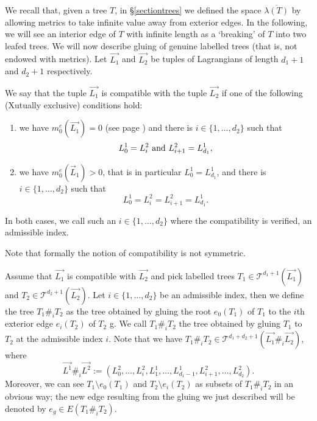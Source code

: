 We recall that, given a tree $T$, in \S \ref{sectiontrees} we defined the space $\overline{\lambda(T)}$ by allowing metrics to take infinite value away from exterior edges. In the following, we will see an interior edge of $T$ with infinite length as a `breaking' of $T$ into two leafed trees. We will now describe gluing of genuine labelled trees (that is, not endowed with metrics). Let $\vec{L_1}$ and $\vec{L_2}$ be tuples of Lagrangians of length $d_1+1$ and $d_2+1$ respectively.
\begin{dfn} \label{compatibilitydef}
	We say that the tuple $\vec{L_1}$ is compatible with the tuple $\vec{L_2}$ if one of the following (Xutually exclusive) conditions hold:
	\begin{enumerate}
		\item\label{firstcomp} we have $m_0^e(\vec{L_1})=0$ (see page \pageref{defofmis}) and there is $i\in \{1,\ldots, d_2\}$ such that $$L_0^1=L_i^2 \textnormal{   and   }L_{i+1}^2=L_{d_1}^1,$$
		\item\label{secondcomp} we have $m_0^e(\vec{L}_1)>0$, that is in particular $L_0^1=L_{d_1}^1$, and there is $i\in\{1,\ldots,d_2\}$ such that $$L_0^1=L_i^2=L_{i+1}^2=L_{d_1}^1.$$ 
	\end{enumerate}
	In both cases, we call such an $i\in \{1,\ldots, d_2\}$ where the compatibility is verified, an admissible index.
\end{dfn}
\begin{rem}
	Note that formally the notion of compatibility is not symmetric.
\end{rem}
\noindent Assume that $\vec{L_1}$ is compatible with $\vec{L_2}$ and pick labelled trees $T_1\in \mathcal{T}^{d_1+1}(\vec{L_1})$ and $T_2\in \mathcal{T}^{d_2+1}(\vec{L_2})$. Let $i\in \{1,\ldots, d_2\}$ be an admissible index, then we define the tree $T_1\#_iT_2$ as the tree obtained by gluing the root $e_0(T_1)$ of $T_1$ to the $i$th exterior edge $e_i(T_2)$ of $T_2$ g. We call $T_1\#_iT_2$ the tree obtained by gluing $T_1$ to $T_2$ at the admissible index $i$. Note that we have $T_1\#_iT_2\in \mathcal{T}^{d_1+d_2+1}(\vec{L_1}\#_i\vec{L_2})$, where \label{cancelletto} $$\vec{L^1}\#_i\vec{L^2}:=\left(L_0^2,\ldots, L_i^2,L_1^1,\ldots, L_{d_1-1}^1,L_{i+1}^2,\ldots, L_{d_2}^2\right).$$ Moreover, we can see $T_1\setminus e_0(T_1)$ and $T_2\setminus e_i(T_2)$ as subsets of $T_1\#_iT_2$ in an obvious way; the new edge resulting from the gluing we just described will be denoted by $e_g\in E(T_1\#_iT_2)$.\\

